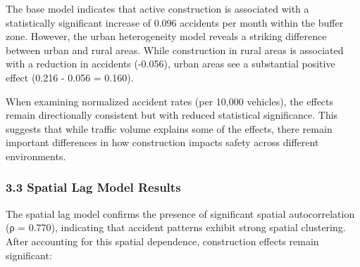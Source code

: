 \documentclass[
]{article}
\begin{document}
The base model indicates that active construction is associated with a
statistically significant increase of 0.096 accidents per month within
the buffer zone. However, the urban heterogeneity model reveals a
striking difference between urban and rural areas. While construction in
rural areas is associated with a reduction in accidents (-0.056), urban
areas see a substantial positive effect (0.216 - 0.056 = 0.160).

When examining normalized accident rates (per 10,000 vehicles), the
effects remain directionally consistent but with reduced statistical
significance. This suggests that while traffic volume explains some of
the effects, there remain important differences in how construction
impacts safety across different environments.

\subsubsection{3.3 Spatial Lag Model
Results}\label{spatial-lag-model-results}

The spatial lag model confirms the presence of significant spatial
autocorrelation (ρ = 0.770), indicating that accident patterns exhibit
strong spatial clustering. After accounting for this spatial dependence,
construction effects remain significant:
\end{document}

